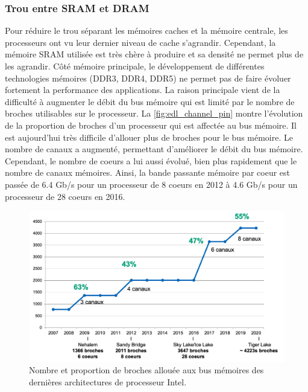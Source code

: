     \subsubsection{Trou entre SRAM et DRAM} 
        Pour réduire le trou séparant les mémoires caches et la mémoire centrale, les processeurs ont vu leur dernier niveau de cache s'agrandir. Cependant, la mémoire SRAM utilisée est très chère à produire et sa densité ne permet plus de les agrandir. Côté mémoire principale, le développement de différentes technologies mémoires (DDR3, DDR4, DDR5) ne permet pas de faire évoluer fortement la performance des applications. La raison principale vient de la difficulté à augmenter le débit du bus mémoire qui est limité par le nombre de broches utilisables sur le processeur. La \autoref{fig:edl_channel_pin} montre l'évolution de la proportion de broches d'un processeur qui est affectée au bus mémoire. Il est aujourd'hui très difficile d'allouer plus de broches pour le bus mémoire. Le nombre de canaux a augmenté, permettant d'améliorer le débit du bus mémoire. Cependant, le nombre de coeurs a lui aussi évolué, bien plus rapidement que le nombre de canaux mémoires. Ainsi, la bande passante mémoire par coeur est passée de 6.4 Gb/s pour un processeur de 8 coeurs en 2012 à 4.6 Gb/s pour un processeur de 28 coeurs en 2016. 
        
        \begin{figure}
            \center
            \includegraphics[width=12cm]{images/edl_channel_pin.png}
            \caption{\label{fig:edl_channel_pin} Nombre et proportion de broches allouée aux bus mémoires des dernières architectures de processeur Intel.}
        \end{figure}
    
